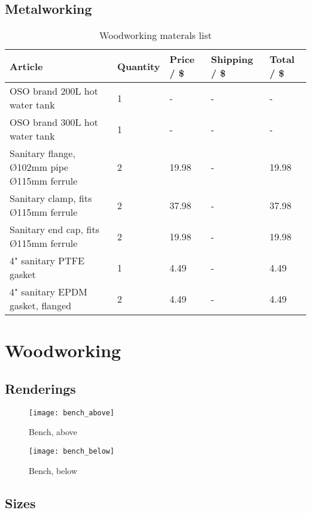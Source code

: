 \documentclass[11pt,fleqn]{book} %
\begin{document}
\section{Metalworking}

\begin{table}[h]
\centering
\begin{tabular}{l l l l l}
\toprule
Article & Quantity & Price / \$ & Shipping / \$ & Total / \$\\
\midrule
OSO brand 200L hot water tank & 1 & - & - & - \\
OSO brand 300L hot water tank & 1 & - & - & - \\
Sanitary flange, Ø102mm pipe Ø115mm ferrule & 2 & 19.98 & - & 19.98 \\
Sanitary clamp, fits Ø115mm ferrule & 2 & 37.98 & - & 37.98 \\
Sanitary end cap, fits Ø115mm ferrule & 2 & 19.98 & - & 19.98\\
4" sanitary PTFE gasket & 1 & 4.49 & - & 4.49 \\
4" sanitary EPDM gasket, flanged & 2 & 4.49 & - & 4.49 \\
\bottomrule
\end{tabular}
\caption{Woodworking materals list}
\end{table}



\chapter{Woodworking}

\section{Renderings}

\begin{figure}[h]
\centering\texttt{[image: bench\_above]}
\caption{Bench, above}
\label{bench_above}
\end{figure}

\begin{figure}[h]
\centering\texttt{[image: bench\_below]}
\caption{Bench, below}
\end{figure}

\section{Sizes}
\end{document}
